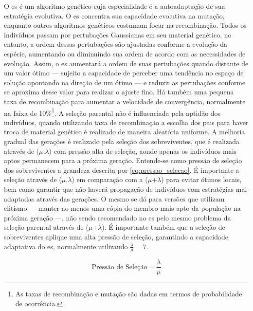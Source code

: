 O \acs{es} é um algoritmo genético cuja especialidade é a
autoadaptação de sua estratégia evolutiva. O \acs{es} concentra sua
capacidade evolutiva na mutação, enquanto outros algoritmos genéticos
costumam focar na recombinação. Todos os indivíduos passam por
pertubações Gaussianas em seu material genético, no entanto, a ordem
dessas pertubações são ajustadas conforme a evolução da espécie,
aumentando ou diminuindo sua ordem de acordo com as necessidades de
evolução. Assim, o \acs{es} aumentará a ordem de suas pertubações
quando distante de um valor ótimo --- sujeito a capacidade de perceber
uma tendência no espaço de solução apontando na direção de um ótimo
--- e reduzir as pertubações conforme se aproxima desse valor para
realizar o ajuste fino. Há também uma pequena taxa de recombinação
para aumentar a velocidade de convergência, normalmente na faixa de
10\%\footnote{As taxas de recombinação e mutação são dadas em termos
de probabilidade de ocorrência.}. A seleção parental não é influenciada pela aptidão
dos indivíduos, quando utilizando taxa de recombinação a escolha dos
pais para haver troca de material genético é realizado de maneira
aleatória uniforme. A melhoria gradual das gerações é realizado pela
seleção dos sobreviventes, que é realizada através de
($\mu$,$\lambda$) com pressão alta de seleção, aonde apenas os
indivíduos mais aptos permanecem para a próxima geração. Entende-se como pressão
de seleção dos sobreviventes a grandeza descrita por
\ref{eq:pressao_selecao}. É importante a seleção
através de ($\mu$,$\lambda$) em comparação com a ($\mu$+$\lambda$)
para evitar ótimos locais, bem como garantir que não haverá propagação
de indivíduos com estratégias mal-adaptadas através das gerações. O
mesmo se dá para versões que utilizam elitismo --- manter ao menos uma
cópia do membro mais apto da população na próxima geração ---, não
sendo recomendado no \acs{es} pelo mesmo problema da seleção parental
através de ($\mu$+$\lambda$). É importante também que a seleção de
sobreviventes aplique uma alta pressão de seleção, garantindo a
capacidade adaptativa do \acs{es}, normalmente utilizando
$\frac{\lambda}{\mu}=7$.

\begin{equation}\label{eq:pressao_selecao}
\text{Pressão de Seleção} = \dfrac{\lambda}{\mu}
\end{equation}

